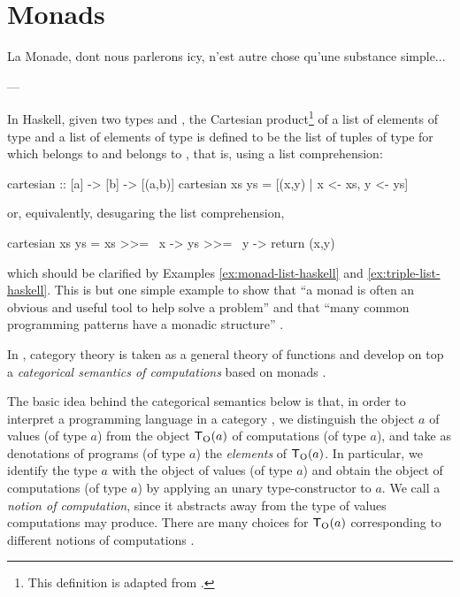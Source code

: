 \chapter{Monads}
\label{chap:monads}

\epigraph{
  La Monade, dont nous parlerons icy, n'est autre chose qu'une
  substance simple...
}{---\textcite[1]{leibniz-1714}}


In Haskell, given two types  and , the
Cartesian product\footnote{This definition is adapted from
  \parencite{weisstein-cartesian}.} of a list  of
elements of type  and a list  of
elements of type  is defined to be the list of tuples
 of type  for which
 belongs to  and 
belongs to , that is, using a list comprehension:
\begin{codehaskell}
cartesian :: [a] -> [b] -> [(a,b)]
cartesian xs ys = [(x,y) | x <- xs, y <- ys]
\end{codehaskell}
or, equivalently, desugaring the list comprehension,
\begin{codehaskell}
cartesian xs ys = xs >>= \ x -> ys >>= \ y -> return (x,y)
\end{codehaskell}
which should be clarified by Examples \ref{ex:monad-list-haskell} and
\ref{ex:triple-list-haskell}. This is but one simple example to show
that ``a monad is often an obvious and useful tool to help solve a
problem'' \parencite[325]{osullivan-2008} and that ``many common
programming patterns have a monadic structure''
\parencite[328]{osullivan-2008}.



In \parencite{moggi-1991}, category theory is taken as a general
theory of functions and develop on top a \emph{categorical semantics
  of computations} based on monads \parencite[56]{moggi-1991}.

The basic idea behind the categorical semantics below is that, in
order to interpret a programming language in a category , we
distinguish the object $a$ of values (of type $a$) from the object
$\mathsf{T}_{\operatorname{O}}(a)$ of computations (of type $a$), and take as denotations
of programs (of type $a$) the \emph{elements} of $\mathsf{T}_{\operatorname{O}}(a)$. In
particular, we identify the type $a$ with the object of values (of
type $a$) and obtain the object of computations (of type $a$) by
applying an unary type-constructor  to $a$. We call 
a \emph{notion of computation}, since it abstracts away from the type
of values computations may produce. There are many choices for
$\mathsf{T}_{\operatorname{O}}(a)$ corresponding to different notions of computations
\parencite[57--58]{moggi-1991}.


